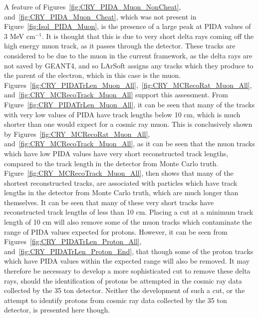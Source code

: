 A feature of Figures~\ref{fig:CRY_PIDA_Muon_NonCheat}, and~\ref{fig:CRY_PIDA_Muon_Cheat}, which was not present in Figure~\ref{fig:Isol_PIDA_Muon}, is the presence of a large peak at PIDA values of 3 MeV cm$^{-1}$. It is thought that this is due to very short delta rays coming off the high energy muon track, as it passes through the detector. These tracks are considered to be due to the muon in the current framework, as the delta rays are not saved by GEANT4, and so LArSoft assigns any tracks which they produce to the parent of the electron, which in this case is the muon. Figures~\ref{fig:CRY_PIDATrLen_Muon_All},~\ref{fig:CRY_MCRecoRat_Muon_All}, and~\ref{fig:CRY_MCRecoTrack_Muon_All} support this assessment. From Figure~\ref{fig:CRY_PIDATrLen_Muon_All}, it can be seen that many of the tracks with very low values of PIDA have track lengths below 10 cm, which is much shorter than one would expect for a cosmic ray muon. This is conclusively shown by Figures~\ref{fig:CRY_MCRecoRat_Muon_All}, and~\ref{fig:CRY_MCRecoTrack_Muon_All}, as it can be seen that the muon tracks which have low PIDA values have very short reconstructed track lengths, compared to the track length in the detector from Monte Carlo truth. Figure~\ref{fig:CRY_MCRecoTrack_Muon_All}, then shows that many of the shortest reconstructed tracks, are associated with particles which have track lengths in the detector from Monte Carlo truth, which are much longer than themselves. It can be seen that many of these very short tracks have reconstructed track lengths of less than 10 cm. Placing a cut at a minimum track length of 10 cm will also remove some of the muon tracks which contaminate the range of PIDA values expected for protons. However, it can be seen from Figures~\ref{fig:CRY_PIDATrLen_Proton_All}, and~\ref{fig:CRY_PIDATrLen_Proton_End}, that though some of the proton tracks which have PIDA values within the expected range will also be removed. It may therefore be necessary to develop a more sophisticated cut to remove these delta rays, should the identification of protons be attempted in the cosmic ray data collected by the 35 ton detector. Neither the development of such a cut, or the attempt to identify protons from cosmic ray data collected by the 35 ton detector, is presented here though. \\

